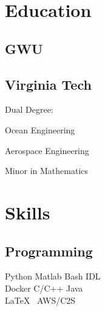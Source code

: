 \documentclass[letterpaper]{deedy-resume} %
\begin{document}
\begin{minipage}[t]{0.30\textwidth} %


\section{Education} 

\subsection{GWU}


\sectionspace %



\subsection{Virginia Tech}


Dual Degree: \\
\begin{tightitemize}
\vspace{\topsep}
\item Ocean Engineering
\item Aerospace Engineering
\end{tightitemize}
Minor in Mathematics \\


\sectionspace %


\section{Skills}

\subsection{Programming}

\quad   Python \textbullet{} Matlab \textbullet{} Bash \textbullet{} IDL \\ 
\quad   Docker \textbullet{} C/C++ \textbullet{} Java \\
\quad   \LaTeX\ \textbullet{} AWS/C2S 


\end{minipage}
\end{document}
